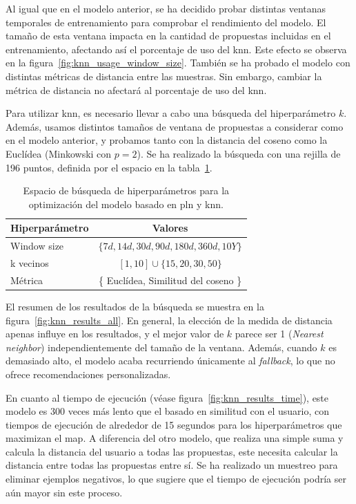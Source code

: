 Al igual que en el modelo anterior, se ha decidido probar distintas ventanas temporales de entrenamiento para comprobar el rendimiento del modelo. El tamaño de esta ventana impacta en la cantidad de propuestas incluidas en el entrenamiento, afectando así el porcentaje de uso del \gls{knn}. Este efecto se observa en la figura~\ref{fig:knn_usage_window_size}. También se ha probado el modelo con distintas métricas de distancia entre las muestras. Sin embargo, cambiar la métrica de distancia no afectará al porcentaje de uso del \gls{knn}.

Para utilizar \gls{knn}, es necesario llevar a cabo una búsqueda del hiperparámetro $k$. Además, usamos distintos tamaños de ventana de propuestas a considerar como en el modelo anterior, y probamos tanto con la distancia del coseno como la Euclídea (Minkowski con $p=2$). Se ha realizado la búsqueda con una rejilla de 196 puntos, definida por el espacio en la tabla~\ref{tab:knn_espacio_busqueda}.

\begin{table}
    \centering
    \begin{tabular}{l|c}
        \toprule
        \textbf{Hiperparámetro} & \textbf{Valores} \\
        \midrule
        Window size & $ \{ 7d,14d,30d,90d,180d,360d,10Y \} $ \\
        k vecinos & $ [1,10] \cup \{15,20,30,50\}$ \\
        Métrica & \{ Euclídea, Similitud del coseno \} \\
        \bottomrule
    \end{tabular}
    \caption{Espacio de búsqueda de hiperparámetros para la optimización del modelo basado en \gls{pln} y \gls{knn}.}
    \label{tab:knn_espacio_busqueda}
\end{table}

El resumen de los resultados de la búsqueda se muestra en la figura~\ref{fig:knn_results_all}. En general, la elección de la medida de distancia apenas influye en los resultados, y el mejor valor de $k$ parece ser 1 (\textit{Nearest neighbor}) independientemente del tamaño de la ventana. Además, cuando $k$ es demasiado alto, el modelo acaba recurriendo únicamente al \textit{fallback}, lo que no ofrece recomendaciones personalizadas.

En cuanto al tiempo de ejecución (véase figura~\ref{fig:knn_results_time}), este modelo es 300 veces más lento que el basado en similitud con el usuario, con tiempos de ejecución de alrededor de 15 segundos para los hiperparámetros que maximizan el \gls{map}. A diferencia del otro modelo, que realiza una simple suma y calcula la distancia del usuario a todas las propuestas, este necesita calcular la distancia entre todas las propuestas entre sí. Se ha realizado un muestreo para eliminar ejemplos negativos, lo que sugiere que el tiempo de ejecución podría ser aún mayor sin este proceso.

